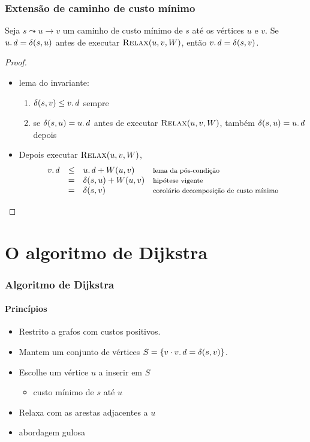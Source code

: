 \documentclass{beamer}
\begin{document}
\begin{frame}
\frametitle{Extensão de caminho de custo mínimo}

\begin{lemma}
Seja $s \leadsto u \rightarrow v$ um caminho de custo mínimo de $s$ até os
vértices $u$ e $v$. Se $\attrib{u}{d} = \delta(s, u)$ antes de executar
$\textnormal{\scshape Relax}(u, v, W)$, então $\attrib{v}{d} = \delta(s, v)$.
\end{lemma}

\begin{proof}
\begin{itemize}
\item lema do invariante: 
\begin{enumerate}
\item $\delta(s, v) \le \attrib{v}{d}$ sempre
\item se $\delta(s, u) = \attrib{u}{d}$ antes de executar $\textnormal{\scshape Relax}(u, v, W)$, também
$\delta(s, u) = \attrib{u}{d}$ depois
\end{enumerate}
\item Depois executar $\textnormal{\scshape Relax}(u, v, W)$,
$$
\begin{array}{rcll}
\attrib{v}{d} & \le & \attrib{u}{d} + W(u, v)  & \text{\footnotesize lema da pós-condição} \\
& = & \delta(s, u) + W(u, v) & \text{\footnotesize hipótese vigente} \\
& = & \delta(s, v) & \text{\footnotesize corolário decomposição de custo mínimo}
\end{array}
$$
\end{itemize}
\end{proof}
\end{frame}

\section{O algoritmo de Dijkstra}

\begin{frame}
\frametitle{Algoritmo de Dijkstra}
\framesubtitle{Princípios}

\begin{itemize}
\item Restrito a grafos com custos positivos.
\item Mantem um conjunto de vértices $S = \{ v \cdot \attrib{v}{d} = \delta(s, v)\}$.
\item Escolhe um vértice $u$ a inserir em $S$
\begin{itemize}
\item custo mínimo de $s$ até $u$
\end{itemize}
\item Relaxa com as arestas adjacentes a $u$
\item abordagem \alert{gulosa}
\end{itemize}

\end{frame}
\end{document}
